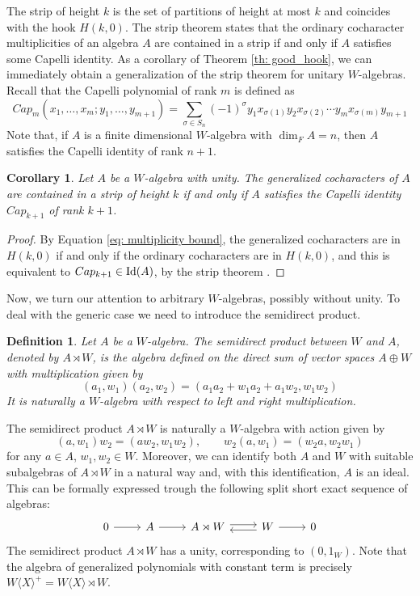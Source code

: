 \documentclass{article}
\newtheorem{corollary}[theorem]{Corollary}
\newtheorem{definition}[theorem]{Definition}
\newcommand{\wa}{A\rtimes W}
\newcommand{\WX}{W\langle X\rangle}
\DeclareMathOperator{\id}{\textnormal{Id}}
\begin{document}
The strip of height $k$ is the set of partitions of height at most $k$ and coincides with the hook $H(k,0)$. The strip theorem \cite{Reg79} states that the ordinary cocharacter multiplicities of an algebra $A$ are contained in a strip if and only if $A$ satisfies some Capelli identity. As a corollary of Theorem \ref{th: good_hook}, we can immediately obtain a generalization of the strip theorem for unitary $W$-algebras. Recall that the Capelli polynomial of rank $m$ is defined as
\[
Cap_m(x_1,\ldots,x_m;y_1,\ldots,y_{m+1})=\sum_{\sigma \in S_n} (-1)^\sigma y_1x_{\sigma(1)}y_2x_{\sigma(2)}\cdots y_mx_{\sigma(m)}y_{m+1}
\]
Note that, if $A$ is a finite dimensional $W$-algebra with $\dim_F A=n$, then $A$ satisfies the Capelli identity of rank $n+1$. 

\begin{corollary}\label{cor: hook_unity}
	Let $A$ be a $W$-algebra with unity. The generalized cocharacters of $A$ are contained in a strip of height $k$ if and only if $A$ satisfies the Capelli identity $Cap_{k+1}$ of rank $k+1$.
\end{corollary}
\begin{proof}
	By Equation \eqref{eq: multiplicity bound}, the generalized cocharacters are in $H(k,0)$ if and only if the ordinary cocharacters are in $H(k,0)$, and this is equivalent to $Cap_{k+1}\in \id(A)$, by the strip theorem \cite{Reg79}.
\end{proof}

Now, we turn our attention to arbitrary $W$-algebras, possibly without unity. To deal with the generic case we need to introduce the semidirect product.

\begin{definition}
	Let $A$ be a $W$-algebra. The semidirect product between $W$ and $A$, denoted by $\wa$, is the algebra defined on the direct sum of vector spaces $A\oplus W$ with multiplication given by
	\[ (a_1,w_1)(a_2,w_2) = (a_1a_2 + w_1a_2 +a_1w_2, w_1w_2) \]
    It is naturally a $W$-algebra with respect to left and right multiplication.
\end{definition}

The semidirect product $\wa$ is naturally a $W$-algebra with action given by
\[ (a,w_1)w_2=(aw_2,w_1w_2),\qquad w_2(a,w_1)=(w_2a,w_2w_1)  \]
for any $a\in A$, $w_1,w_2\in W$. Moreover, we can identify both $A$ and $W$ with suitable subalgebras of $\wa$ in a natural way and, with this identification, $A$ is an ideal. This can be formally expressed trough the following split short exact sequence of algebras: 
\[ \begin{tikzcd}
    0 \arrow[r] & A \arrow[r] & \wa \arrow[r,shift left] & W \arrow[l, shift left] \arrow[r]  & 0
\end{tikzcd} \]
The semidirect product $\wa$ has a unity, corresponding to $(0,1_W)$. Note that the algebra of generalized polynomials with constant term is precisely $\WX^+=\WX\rtimes W$.
\end{document}
